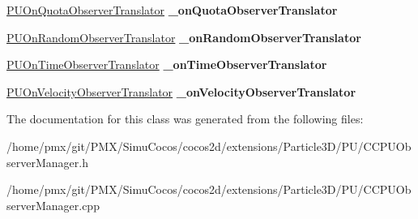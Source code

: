 \begin{DoxyCompactItemize}
\mbox{\label{classPUObserverManager_ab1c1b6f60532c1b5f76baaff5530afbb}} 
\hyperlink{classPUOnQuotaObserverTranslator}{P\+U\+On\+Quota\+Observer\+Translator} {\bfseries \+\_\+on\+Quota\+Observer\+Translator}
\item 
\mbox{\label{classPUObserverManager_a4f6562c6d9704a4698d44bf7326b653f}} 
\hyperlink{classPUOnRandomObserverTranslator}{P\+U\+On\+Random\+Observer\+Translator} {\bfseries \+\_\+on\+Random\+Observer\+Translator}
\item 
\mbox{\label{classPUObserverManager_a36b6d1e3336c0b9b6c4b92f7ac4ce7df}} 
\hyperlink{classPUOnTimeObserverTranslator}{P\+U\+On\+Time\+Observer\+Translator} {\bfseries \+\_\+on\+Time\+Observer\+Translator}
\item 
\mbox{\label{classPUObserverManager_ad264117a130d12dd51ec1f487bf8e354}} 
\hyperlink{classPUOnVelocityObserverTranslator}{P\+U\+On\+Velocity\+Observer\+Translator} {\bfseries \+\_\+on\+Velocity\+Observer\+Translator}
\end{DoxyCompactItemize}


The documentation for this class was generated from the following files\+:\begin{DoxyCompactItemize}
\item 
/home/pmx/git/\+P\+M\+X/\+Simu\+Cocos/cocos2d/extensions/\+Particle3\+D/\+P\+U/C\+C\+P\+U\+Observer\+Manager.\+h\item 
/home/pmx/git/\+P\+M\+X/\+Simu\+Cocos/cocos2d/extensions/\+Particle3\+D/\+P\+U/C\+C\+P\+U\+Observer\+Manager.\+cpp\end{DoxyCompactItemize}
